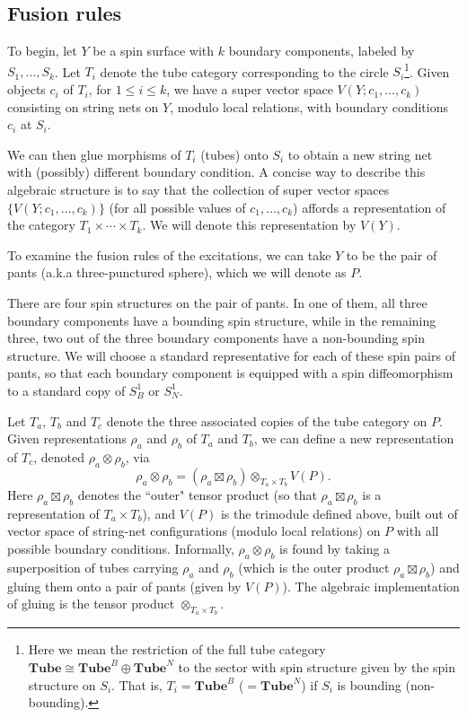\documentclass[12pt,a4paper]{article}
\newcommand{\tp}{\otimes}
\newcommand\be            {\begin{equation}}
\newcommand\ee            {\end{equation}}
\newcommand{\tube}{\textbf{Tube}}
\newcommand{\kw}[1]{{\color{kwcolor}\footnotesize{(KW) #1}}}
\begin{document}
\subsection{Fusion rules} \label{fusion_rules}

To begin, let $Y$ be a spin surface with $k$ boundary components, labeled by $S_1,\ldots,S_k$.
Let $T_i$ denote the tube category corresponding to the circle $S_i$\footnote{Here we mean the 
restriction of the full tube category $\tube \cong \tube^B \oplus \tube^N$ to the sector with 
spin structure given by the spin structure on $S_i$. 
That is, $T_i = \tube^B$ ($=\tube^N$) if $S_i$ is bounding (non-bounding).}.
Given objects $c_i$ of $T_i$, for $1\le i \le k$, we have a super vector space $V(Y; c_1,\ldots,c_k)$ consisting on string nets
on $Y$, modulo local relations, with boundary conditions $c_i$ at $S_i$.

We can then glue morphisms of $T_i$ (tubes) onto $S_i$ to obtain a new string net with (possibly) different boundary condition.
A concise way to describe this algebraic structure is to say that the collection of super vector spaces $\{V(Y; c_1,\ldots,c_k)\}$
(for all possible values of $c_1,\ldots,c_k$)
affords a representation of the category $T_1\times\cdots\times T_k$.
We will denote this representation by $V(Y)$.

To examine the fusion rules of the excitations, we can take $Y$ to be the 
pair of pants (a.k.a three-punctured sphere), which we will denote as $P$. 

There are four spin structures on the pair of pants. 
In one of them, all three boundary components have a bounding spin structure, while in 
the remaining three, two out of the three boundary components have a non-bounding spin structure.
We will choose a standard representative for each of these spin pairs of pants, 
so that each boundary component is equipped with a spin diffeomorphism to a 
standard copy of $S^1_B$ or $S^1_N$.

Let $T_a$, $T_b$ and $T_c$ denote the three associated copies of the tube category on $P$.
Given representations $\rho_a$ and $\rho_b$ of $T_a$ and $T_b$, we can define a new representation of $T_c$,
denoted $\rho_a\tp\rho_b$, via
\be  \label{tctpdef}
	\rho_a\tp\rho_b = (\rho_a \boxtimes \rho_b) \tp_{T_a\times T_b} V(P) .
\ee
Here $\rho_a \boxtimes \rho_b$ denotes the ``outer" tensor product (so that $\rho_a \boxtimes \rho_b$ is a representation of $T_a\times T_b$), 
and $V(P)$ is the 
trimodule defined above, built out of
vector space of string-net configurations (modulo local relations) on $P$ with all possible boundary conditions. 
Informally, $\rho_a\tp \rho_b$ is found by taking a superposition of tubes carrying $\rho_a$ and $\rho_b$ 
(which is the outer product $\rho_a\boxtimes\rho_b$) and gluing them onto a pair of pants (given by $V(P)$). 
The algebraic implementation of gluing is the tensor product $\tp_{T_a\times T_b}$. 
\end{document}
